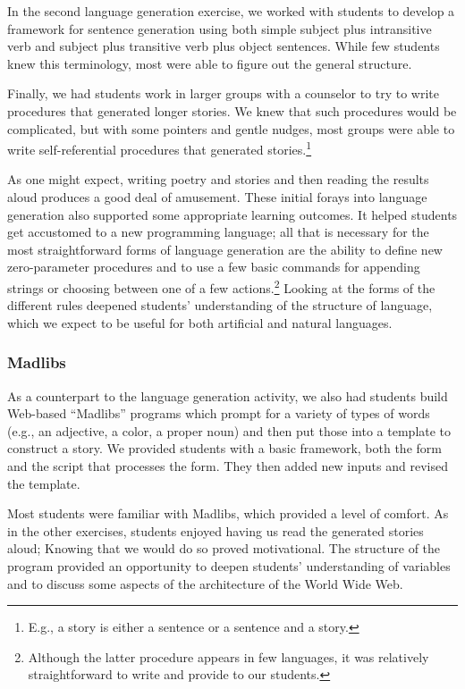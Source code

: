 In the second language generation exercise, we worked with students
to develop a framework for sentence generation using both simple
subject plus intransitive verb and subject plus transitive verb
plus object sentences.  While few students knew this terminology,
most were able to figure out the general structure.

Finally, we had students work in larger groups with a counselor to
try to write procedures that generated longer stories.    We knew
that such procedures would be complicated, but with some pointers
and gentle nudges, most groups were able to write self-referential
procedures that generated stories.\footnote{E.g., a story is either
a sentence or a sentence and a story.}

As one might expect, writing poetry and stories and then reading
the results aloud produces a good deal of amusement.  These initial
forays into language generation also supported some appropriate
learning outcomes.  It helped students get accustomed to a new
programming language; all that is necessary for the most straightforward
forms of language generation are the ability to define new zero-parameter
procedures and to use a few basic commands for appending strings
or choosing between one of a few actions.\footnote{Although the
latter procedure appears in few languages, it was relatively
straightforward to write and provide to our students.}   Looking
at the forms of the different rules deepened students' understanding
of the structure of language, which we expect to be useful for both
artificial and natural languages.

\subsubsection{Madlibs}

As a counterpart to the language generation activity, we also had students
build Web-based ``Madlibs'' programs which prompt for a variety of types
of words (e.g., an adjective, a color, a proper noun) and then put those
into a template to construct a story.  We provided students with a basic
framework, both the form and the script that processes the form.  They
then added new inputs and revised the template.

Most students were familiar with Madlibs, which provided a level
of comfort. As in the other exercises, students enjoyed having us
read the generated stories aloud;  Knowing that we would do so
proved motivational.  The structure of the program
provided an opportunity to deepen students' understanding of variables
and to discuss some aspects of the architecture of the World Wide
Web.

